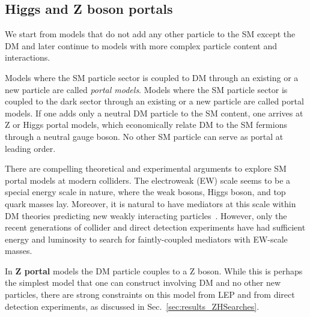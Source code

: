 \subsection{Higgs and Z boson portals}
\label{sec:HZPortalModels}

We start from models that do not add any other particle to the SM except the DM and later continue to models with more complex particle content and interactions. 

Models where the SM particle sector is coupled to DM through an existing or a new particle are called \textit{portal models}. Models where the SM particle sector is coupled to the dark sector through an existing or a new particle are called portal models. If one adds only a neutral DM particle to the SM content, one arrives at Z or Higgs portal models, which economically relate DM to the SM fermions through a neutral gauge boson. No other SM particle can serve as portal at leading order. 


There are compelling theoretical and experimental arguments to explore SM portal models at modern colliders. 
The electroweak (EW) scale seems to be a special energy scale in nature, where the weak bosons, Higgs boson, and top quark masses lay. Moreover, it is natural to have mediators at this scale within DM theories predicting new weakly interacting particles~\cite{Cotta:2012nj,Arcadi:2014lta}.
However, only the recent generations of collider and direct detection experiments have had sufficient energy and luminosity to search for faintly-coupled mediators with EW-scale masses.

In \textbf{Z portal} models the DM particle couples to a Z boson. While this is perhaps the simplest model that one can construct involving DM and no other new particles, there are strong constraints on this model from LEP and from direct detection experiments, as discussed in Sec.~\ref{sec:results_ZHSearches}. 

